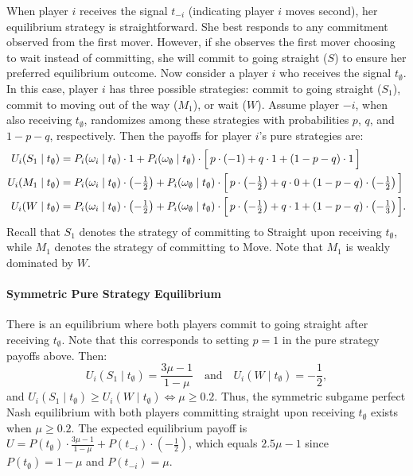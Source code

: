 \documentclass[../paper.tex]{subfiles}
\begin{document}
When player $i$ receives the signal $t_{-i}$ (indicating player $i$ moves second), her equilibrium strategy is straightforward. She best responds to any commitment observed from the first mover. However, if she observes the first mover choosing to wait instead of committing, she will commit to going straight ($S$) to ensure her preferred equilibrium outcome. Now consider a player $i$ who receives the signal $t_\emptyset$. In this case, player $i$ has three possible strategies: commit to going straight ($S_1$), commit to moving out of the way ($M_1$), or wait ($W$). Assume player $-i$, when also receiving $t_\emptyset$, randomizes among these strategies with probabilities $p$, $q$, and $1 - p - q$, respectively. Then the payoffs for player $i$’s pure strategies are:
\begin{align*}
U_i(S_{1} \mid t_\emptyset)
  &= P_i(\omega_i \mid t_\emptyset) \cdot 1
     + P_i(\omega_\emptyset \mid t_\emptyset) \cdot
       \Bigl[\, p \cdot (-1) + q \cdot 1 + (1 - p - q) \cdot 1 \,\Bigr]
\\
U_i(M_{1} \mid t_\emptyset)
  &= P_i(\omega_i \mid t_\emptyset) \cdot \left(-\tfrac{1}{2}\right)
     + P_i(\omega_\emptyset \mid t_\emptyset) \cdot
       \Bigl[\, p \cdot \left(-\tfrac{1}{2}\right) + q \cdot 0 + (1 - p - q) \cdot \left(-\tfrac{1}{2}\right) \,\Bigr]
\\
U_i(W \mid t_\emptyset)
  &= P_i(\omega_i \mid t_\emptyset) \cdot \left(-\tfrac{1}{2}\right)
     + P_i(\omega_\emptyset \mid t_\emptyset) \cdot
       \Bigl[\, p \cdot \left(-\tfrac{1}{2}\right) + q \cdot 1 + (1 - p - q) \cdot \left(-\tfrac{1}{3}\right) \,\Bigr].
\end{align*}
Recall that $S_1$ denotes the strategy of committing to Straight upon receiving $t_\emptyset$, while $M_1$ denotes the strategy of committing to Move. Note that $M_1$ is weakly dominated by $W$.

\paragraph{Symmetric Pure Strategy Equilibrium} There is an equilibrium where both players commit to going straight after receiving $t_\emptyset$. Note that this corresponds to setting $p=1$ in the pure strategy payoffs above. Then:
\begin{equation}
    U_i(S_1 \mid t_\emptyset) = \frac{3\mu - 1}{1 - \mu}
    \quad \text{and} \quad
    U_i(W \mid t_\emptyset) = -\frac{1}{2},
    \label{eq:alwaysstraightaftert_emptyset}
\end{equation}
and $U_i(S_1 \mid t_\emptyset)\geq U_i(W \mid t_\emptyset)\Leftrightarrow\mu\geq0.2$. Thus, the symmetric subgame perfect Nash equilibrium with both players committing straight upon receiving $t_\emptyset$ exists when $\mu\geq0.2$. 
The expected equilibrium payoff is $U=P(t_\emptyset)\cdot\frac{3\mu - 1}{1 - \mu}+P(t_{-i})\cdot(-\frac{1}{2})$, which equals $2.5\mu-1$ since $P(t_\emptyset)=1-\mu$ and $P(t_{-i})=\mu$.
 
\end{document}
